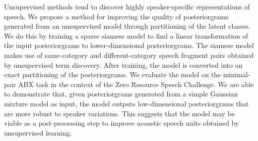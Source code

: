 Unsupervised methods tend to discover highly speaker-specific representations of speech.
We propose a method for improving the quality of posteriorgrams generated from an unsupervised model through partitioning of the latent classes.
We do this by training a sparse siamese model to find a linear transformation of the input posteriorgrams to lower-dimensional posteriorgrams.
The siamese model makes use of same-category and different-category speech fragment pairs obtained by unsupervised term discovery.
After training, the model is converted into an exact partitioning of the posteriorgrams.
We evaluate the model on the minimal-pair ABX task in the context of the Zero Resource Speech Challenge.
We are able to demonstrate that, given posteriorgrams generated from a simple Gaussian mixture model as input, the model outputs low-dimensional posteriorgrams that are more robust to speaker variations.
This suggests that the model may be viable as a post-processing step to improve acoustic speech units obtained by unsupervised learning.

